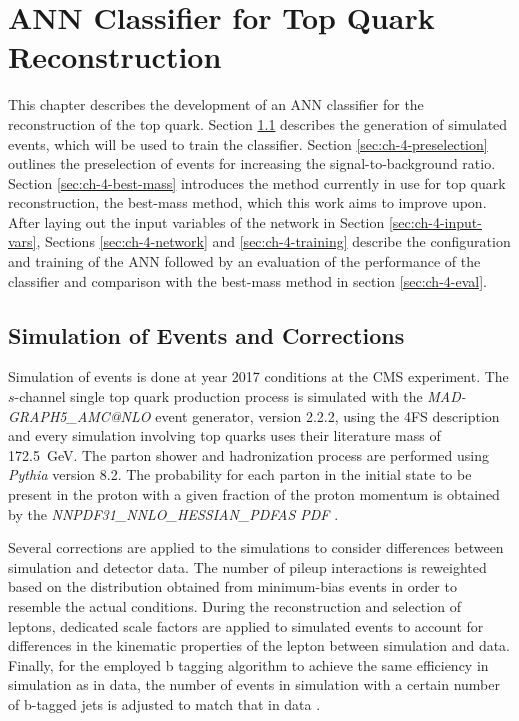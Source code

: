 \chapter{ANN Classifier for Top Quark Reconstruction}
\label{ch:classifier}

This chapter describes the development of an ANN classifier for the reconstruction of the top quark.
Section \ref{sec:ch-4-simulation} describes the generation of simulated events, which will be used to train the classifier. Section \ref{sec:ch-4-preselection} outlines the preselection of events for increasing the signal-to-background ratio. Section \ref{sec:ch-4-best-mass} introduces the method currently in use for top quark reconstruction, the best-mass method, which this work aims to improve upon. After laying out the input variables of the network in Section \ref{sec:ch-4-input-vars}, Sections \ref{sec:ch-4-network} and \ref{sec:ch-4-training} describe the configuration and training of the ANN followed by an evaluation of the performance of the classifier and comparison with the best-mass method in section \ref{sec:ch-4-eval}.

\section{Simulation of Events and Corrections}
\label{sec:ch-4-simulation}
Simulation of events is done at year 2017 conditions at the CMS experiment. The $s$-channel single top quark production process is simulated with the \emph{MAD-GRAPH5\_AMC@NLO} event generator, version 2.2.2, using the 4FS description \cite{2009JHEPA} and every simulation involving top quarks uses their literature mass of \SI{172.5}{GeV}. The parton shower and hadronization process are performed using \emph{Pythia} version 8.2. The probability for each parton in the initial state to be present in the proton with a given fraction of the proton momentum is obtained by the \emph{NNPDF31\_NNLO\_HESSIAN\_PDFAS PDF} \cite{2015CoPhC.191.159S}.

Several corrections are applied to the simulations to consider differences between simulation and detector data. The number of pileup interactions is reweighted based on the distribution obtained from minimum-bias events in order to resemble the actual conditions. During the reconstruction and selection of leptons, dedicated scale factors are applied to simulated events to account for differences in the kinematic properties of the lepton between simulation and data. Finally, for the employed b tagging algorithm to achieve the same efficiency in simulation as in data, the number of events in simulation with a certain number of b-tagged jets is adjusted to match that in data \cite{CMS-b-tagging}.

